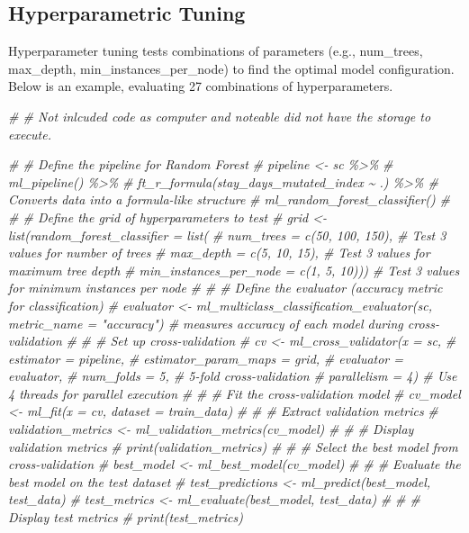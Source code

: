 \documentclass[
]{article}
\newenvironment{Shaded}{\begin{snugshade}}{\end{snugshade}}
\newcommand{\CommentTok}[1]{\textcolor[rgb]{0.56,0.35,0.01}{\textit{#1}}}
\begin{document}
\subsection{Hyperparametric Tuning}\label{hyperparametric-tuning}

Hyperparameter tuning tests combinations of parameters (e.g.,
num\_trees, max\_depth, min\_instances\_per\_node) to find the optimal
model configuration. Below is an example, evaluating 27 combinations of
hyperparameters.

\begin{Shaded}
\begin{Highlighting}[]
\CommentTok{\# \# Not inlcuded code as computer and noteable did not have the storage to execute. }

\CommentTok{\# \# Define the pipeline for Random Forest}
\CommentTok{\# pipeline \textless{}{-} sc \%\textgreater{}\%}
\CommentTok{\#   ml\_pipeline() \%\textgreater{}\%}
\CommentTok{\#   ft\_r\_formula(stay\_days\_mutated\_index \textasciitilde{} .) \%\textgreater{}\% \# Converts data into a formula{-}like structure}
\CommentTok{\#   ml\_random\_forest\_classifier()}
\CommentTok{\# }
\CommentTok{\# \# Define the grid of hyperparameters to test}
\CommentTok{\# grid \textless{}{-} list(random\_forest\_classifier = list(}
\CommentTok{\#     num\_trees = c(50, 100, 150),          \# Test 3 values for number of trees}
\CommentTok{\#     max\_depth = c(5, 10, 15),            \# Test 3 values for maximum tree depth}
\CommentTok{\#     min\_instances\_per\_node = c(1, 5, 10))) \# Test 3 values for minimum instances per node}
\CommentTok{\# }
\CommentTok{\# \# Define the evaluator (accuracy metric for classification)}
\CommentTok{\# evaluator \textless{}{-} ml\_multiclass\_classification\_evaluator(sc, metric\_name = "accuracy") \# measures accuracy of each model during cross{-}validation }
\CommentTok{\# }
\CommentTok{\# \# Set up cross{-}validation}
\CommentTok{\# cv \textless{}{-} ml\_cross\_validator(x = sc,}
\CommentTok{\#   estimator = pipeline,}
\CommentTok{\#   estimator\_param\_maps = grid,}
\CommentTok{\#   evaluator = evaluator,}
\CommentTok{\#   num\_folds = 5,    \# 5{-}fold cross{-}validation}
\CommentTok{\#   parallelism = 4)   \# Use 4 threads for parallel execution}
\CommentTok{\# }
\CommentTok{\# \# Fit the cross{-}validation model}
\CommentTok{\# cv\_model \textless{}{-} ml\_fit(x = cv, dataset = train\_data)}
\CommentTok{\# }
\CommentTok{\# \# Extract validation metrics}
\CommentTok{\# validation\_metrics \textless{}{-} ml\_validation\_metrics(cv\_model)}
\CommentTok{\# }
\CommentTok{\# \# Display validation metrics}
\CommentTok{\# print(validation\_metrics)}
\CommentTok{\# }
\CommentTok{\# \# Select the best model from cross{-}validation}
\CommentTok{\# best\_model \textless{}{-} ml\_best\_model(cv\_model)}
\CommentTok{\# }
\CommentTok{\# \# Evaluate the best model on the test dataset}
\CommentTok{\# test\_predictions \textless{}{-} ml\_predict(best\_model, test\_data)}
\CommentTok{\# test\_metrics \textless{}{-} ml\_evaluate(best\_model, test\_data)}
\CommentTok{\# }
\CommentTok{\# \# Display test metrics}
\CommentTok{\# print(test\_metrics)}
\end{Highlighting}
\end{Shaded}
\end{document}
